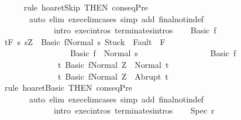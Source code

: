 \begin{isabellebody}
\ \ \ \ \isamarkupfalse%
\ {\isacharparenleft}rule\ hoaret{\isachardot}Skip\ {\isacharbrackleft}THEN\ conseqPre{\isacharbrackright}{\isacharparenright}\isanewline
\ \ \ \ \ \ \ {\isacharparenleft}auto\ elim{\isacharcolon}\ exec{\isacharunderscore}elim{\isacharunderscore}cases\ simp\ add{\isacharcolon}\ final{\isacharunderscore}notin{\isacharunderscore}def\ \isanewline
\ \ \ \ \ \ \ \ \ \ \ \ \ intro{\isacharcolon}\ exec{\isachardot}intros\ terminates{\isachardot}intros{\isacharparenright}\isanewline
{}\isamarkupfalse%
\isanewline
\ \ \isamarkupfalse%
\ {\isacharparenleft}Basic\ f{\isacharparenright}\isanewline
\ \ \isamarkupfalse%
\ {\isachardoublequoteopen}{\isasymGamma}{\isacharcomma}{\isasymTheta}{\isasymturnstile}\isactrlsub t\isactrlbsub {\isacharslash}F\ \isactrlesub {\isacharbraceleft}s{\isachardot}\ s{\isacharequal}Z\ {\isasymand}\ {\isasymGamma}{\isasymturnstile}{\isasymlangle}Basic\ f{\isacharcomma}Normal\ s{\isasymrangle}\ {\isasymRightarrow}{\isasymnotin}{\isacharparenleft}{\isacharbraceleft}Stuck{\isacharbraceright}\ {\isasymunion}\ Fault\ {\isacharbackquote}\ {\isacharparenleft}{\isacharminus}F{\isacharparenright}{\isacharparenright}\ {\isasymand}\ \isanewline
\ \ \ \ \ \ \ \ \ \ \ \ \ \ \ \ \ {\isasymGamma}{\isasymturnstile}Basic\ f\ {\isasymdown}\ Normal\ s{\isacharbraceright}\ \isanewline
\ \ \ \ \ \ \ \ \ \ \ \ \ \ \ \ Basic\ f\isanewline
\ \ \ \ \ \ \ \ \ \ \ \ \ \ {\isacharbraceleft}t{\isachardot}\ {\isasymGamma}{\isasymturnstile}{\isasymlangle}Basic\ f{\isacharcomma}Normal\ Z{\isasymrangle}\ {\isasymRightarrow}\ Normal\ t{\isacharbraceright}{\isacharcomma}\isanewline
\ \ \ \ \ \ \ \ \ \ \ \ \ \ {\isacharbraceleft}t{\isachardot}\ {\isasymGamma}{\isasymturnstile}{\isasymlangle}Basic\ f{\isacharcomma}Normal\ Z{\isasymrangle}\ {\isasymRightarrow}\ Abrupt\ t{\isacharbraceright}{\isachardoublequoteclose}\isanewline
\ \ \ \ \isamarkupfalse%
\ {\isacharparenleft}rule\ hoaret{\isachardot}Basic\ {\isacharbrackleft}THEN\ conseqPre{\isacharbrackright}{\isacharparenright}\ \isanewline
\ \ \ \ \ \ \ {\isacharparenleft}auto\ elim{\isacharcolon}\ exec{\isacharunderscore}elim{\isacharunderscore}cases\ simp\ add{\isacharcolon}\ final{\isacharunderscore}notin{\isacharunderscore}def\ \isanewline
\ \ \ \ \ \ \ \ \ \ \ \ \ intro{\isacharcolon}\ exec{\isachardot}intros\ terminates{\isachardot}intros{\isacharparenright}\isanewline
{}\isamarkupfalse%
\isanewline
\ \ \isamarkupfalse%
\ {\isacharparenleft}Spec\ r{\isacharparenright}\isanewline
\ \ \isamarkupfalse%

\end{isabellebody}
